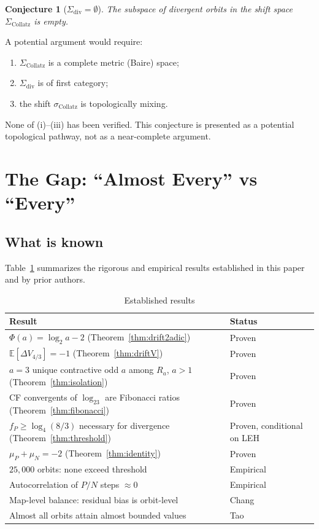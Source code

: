 \documentclass[12pt,reqno]{amsart}
\theoremstyle{plain}
\newtheorem{conjecture}[theorem]{Conjecture}
\theoremstyle{definition}
\newcommand{\E}{\mathbb{E}}
\newcommand{\logtwo}{\log_2}
\newcommand{\logfour}{\log_4}
\newcommand{\fP}{f_P}
\newcommand{\muP}{\mu_P}
\newcommand{\muN}{\mu_N}
\newcommand{\PhiDrift}{\Phi}
\newcommand{\Vmetric}{V_{4/3}}
\begin{document}
\begin{conjecture}[$\Sigma_{\mathrm{div}} = \emptyset$]\label{conj:baire}
The subspace of divergent orbits in the shift space $\Sigma_{\mathrm{Collatz}}$ is empty.
\end{conjecture}

A potential argument would require:
\begin{enumerate}
\item[(i)] $\Sigma_{\mathrm{Collatz}}$ is a complete metric (Baire) space;
\item[(ii)] $\Sigma_{\mathrm{div}}$ is of first category;
\item[(iii)] the shift $\sigma_{\mathrm{Collatz}}$ is topologically mixing.
\end{enumerate}
None of (i)--(iii) has been verified. This conjecture is presented as a
potential topological pathway, not as a near-complete argument.

\section{The Gap: ``Almost Every'' vs ``Every''}\label{sec:gap}

\subsection{What is known}

Table~\ref{tab:known} summarizes the rigorous and empirical results established
in this paper and by prior authors.

\begin{table}[ht]
\centering
\caption{Established results}
\label{tab:known}
\begin{tabular}{@{}ll@{}}
\toprule
Result & Status \\
\midrule
$\PhiDrift(a) = \logtwo a - 2$ (Theorem~\ref{thm:drift2adic}) & Proven \\
$\E[\Delta \Vmetric] = -1$ (Theorem~\ref{thm:driftV}) & Proven \\
$a=3$ unique contractive odd $a$ among $R_a$, $a>1$ (Theorem~\ref{thm:isolation}) & Proven \\
CF convergents of $\logtwo 3$ are Fibonacci ratios (Theorem~\ref{thm:fibonacci}) & Proven \\
$\fP \geq \logfour(8/3)$ necessary for divergence (Theorem~\ref{thm:threshold}) & Proven, conditional on LEH \\
$\muP + \muN = -2$ (Theorem~\ref{thm:identity}) & Proven \\
$25{,}000$ orbits: none exceed threshold & Empirical \\
Autocorrelation of $P/N$ steps $\approx 0$ & Empirical \\
Map-level balance: residual bias is orbit-level & Chang \cite{chang2026reduction} \\
Almost all orbits attain almost bounded values & Tao \cite{tao2019} \\
\bottomrule
\end{tabular}
\end{table}
\end{document}
